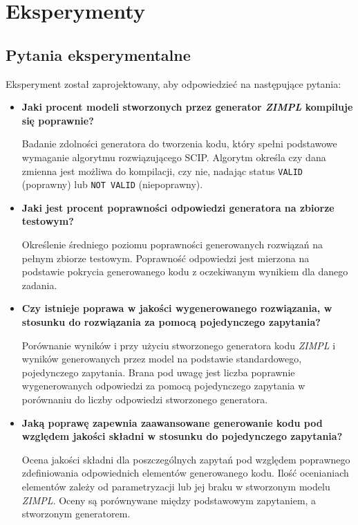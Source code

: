 
\chapter{Eksperymenty}

\section{Pytania eksperymentalne}

Eksperyment został zaprojektowany, aby odpowiedzieć na następujące pytania:
\begin{itemize}
    \item \textbf{Jaki procent modeli stworzonych przez generator  \textit{ZIMPL} kompiluje się poprawnie?}

Badanie zdolności generatora do tworzenia kodu, który spełni podstawowe wymaganie algorytmu rozwiązującego SCIP. Algorytm określa czy dana zmienna jest możliwa do kompilacji, czy nie, nadając status \texttt{VALID} (poprawny) lub \texttt{NOT VALID} (niepoprawny).

    \item \textbf{Jaki jest procent poprawności odpowiedzi generatora na zbiorze testowym?}

 Określenie średniego poziomu poprawności generowanych rozwiązań na pełnym zbiorze testowym. Poprawność odpowiedzi jest mierzona na podstawie pokrycia generowanego kodu z oczekiwanym wynikiem dla danego zadania.
    
    \item \textbf{Czy istnieje poprawa w jakości wygenerowanego rozwiązania, w stosunku do rozwiązania za pomocą pojedynczego zapytania?}

Porównanie wyników i przy użyciu stworzonego generatora kodu  \textit{ZIMPL} i wyników generowanych przez model na podstawie standardowego, pojedynczego zapytania. Brana pod uwagę jest liczba poprawnie wygenerowanych odpowiedzi za pomocą pojedynczego zapytania w porównaniu do liczby odpowiedzi stworzonego generatora.
    
    \item \textbf{Jaką poprawę zapewnia zaawansowane generowanie kodu pod względem jakości składni w stosunku do pojedynczego zapytania?}

Ocena jakości składni dla poszczególnych zapytań pod względem poprawnego zdefiniowania odpowiednich elementów generowanego kodu. Ilość ocenianiach elementów zależy od parametryzacji lub jej braku w stworzonym modelu  \textit{ZIMPL}. Oceny są porównywane między podstawowym zapytaniem, a stworzonym generatorem.
    
\end{itemize}

